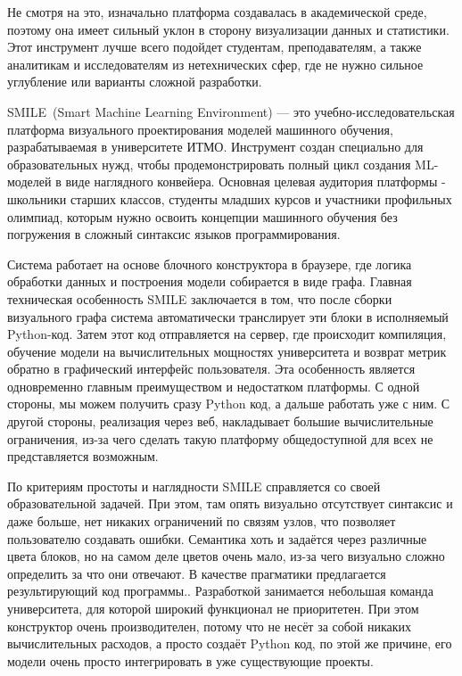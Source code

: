 \documentclass{report}
\begin{document}
Не смотря на это, изначально платформа создавалась в академической среде, поэтому она имеет сильный уклон в сторону визуализации данных и статистики. Этот инструмент лучше всего подойдет студентам, преподавателям, а также аналитикам и исследователям из нетехнических сфер, где не нужно сильное углубление или варианты сложной разработки.

SMILE~(Smart Machine Learning Environment) — это учебно-исследовательская платформа визуального проектирования моделей машинного обучения, разрабатываемая в университете ИТМО. Инструмент создан специально для образовательных нужд, чтобы продемонстрировать полный цикл создания ML-моделей в виде наглядного конвейера. Основная целевая аудитория платформы - школьники старших классов, студенты младших курсов и участники профильных олимпиад, которым нужно освоить концепции машинного обучения без погружения в сложный синтаксис языков программирования.


Система работает на основе блочного конструктора в браузере, где логика обработки данных и построения модели собирается в виде графа. Главная техническая особенность SMILE заключается в том, что после сборки визуального графа система автоматически транслирует эти блоки в исполняемый Python-код. Затем этот код отправляется на сервер, где происходит компиляция, обучение модели на вычислительных мощностях университета и возврат метрик обратно в графический интерфейс пользователя. Эта особенность является одновременно главным преимуществом и недостатком платформы. С одной стороны, мы можем получить сразу Python код, а дальше работать уже с ним. С другой стороны, реализация через веб, накладывает большие вычислительные ограничения, из-за чего сделать такую платформу общедоступной для всех не представляется возможным.

По критериям простоты и наглядности SMILE справляется со своей образовательной задачей. При этом, там опять визуально отсутствует синтаксис и даже больше, нет никаких ограничений по связям узлов, что позволяет пользователю создавать ошибки. Семантика хоть и задаётся через различные цвета блоков, но на самом деле цветов очень мало, из-за чего визуально сложно определить за что они отвечают. В качестве прагматики предлагается результирующий код программы.. Разработкой занимается небольшая команда университета, для которой широкий функционал не приоритетен. При этом конструктор очень производителен, потому что не несёт за собой никаких вычислительных расходов, а просто создаёт Python код, по этой же причине, его модели очень просто интегрировать в уже существующие проекты.
\end{document}
